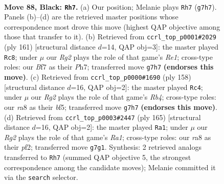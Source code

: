 \documentclass[11pt]{article}
\begin{document}
\clearpage

\begin{figure}[p]\centering
\begin{subfigure}{0.46\textwidth}\centering
\resizebox{\linewidth}{!}{%
\newchessgame
\chessboard[
  setfen={R7/2k2br1/8/1P2R3/4K3/8/8/8 b - - 4 88},
  showmover=false,
  pgfstyle=straightmove, color=movearrow, markmove={g7-h7}
]}
\caption{}
\end{subfigure}\hfill
\begin{subfigure}{0.46\textwidth}\centering
\resizebox{\linewidth}{!}{%
\newchessgame
\chessboard[
  setfen={4r3/7p/5k2/8/6RP/6K1/8/8 b - - 0 81},
  showmover=false,
  pgfstyle=straightmove, color=movearrow, markmove={e8-c8}
]}
\caption{}
\end{subfigure}
\\[4pt]
\begin{subfigure}{0.46\textwidth}\centering
\resizebox{\linewidth}{!}{%
\newchessgame
\chessboard[
  setfen={8/8/3r1k2/4pb2/BR6/4K3/8/8 w - - 8 80},
  showmover=false,
  pgfstyle=straightmove, color=movearrow, markmove={b4-c4}
]}
\caption{}
\end{subfigure}\hfill
\begin{subfigure}{0.46\textwidth}\centering
\resizebox{\linewidth}{!}{%
\newchessgame
\chessboard[
  setfen={r7/8/8/8/4bk2/7R/5P1K/8 b - - 33 83},
  showmover=false,
  pgfstyle=straightmove, color=movearrow, markmove={a8-a1}
]}
\caption{}
\end{subfigure}
\caption{\textbf{Move 88, Black: \texttt{Rh7}.} (a) Our position; Melanie plays \texttt{Rh7} (\texttt{g7h7}). Panels (b)--(d) are the retrieved master positions whose correspondence most drove this move (highest QAP objective among those that transfer to it). (b) Retrieved from \texttt{ccrl\_top\_p0001\#2029} (ply 161) [structural distance $d$=14, QAP obj=3]: the master played \texttt{Rc8}; under $\mu$ our \emph{Rg2} plays the role of that game's \emph{Re1}; cross-type roles: our \emph{B}f7 as their \emph{P}h7; transferred move \texttt{g7h7} \textbf{(endorses this move)}. (c) Retrieved from \texttt{ccrl\_top\_p0000\#1690} (ply 158) [structural distance $d$=16, QAP obj=2]: the master played \texttt{Rc4}; under $\mu$ our \emph{Rg2} plays the role of that game's \emph{Rb4}; cross-type roles: our \emph{r}a8 as their \emph{b}f5; transferred move \texttt{g7h7} \textbf{(endorses this move)}. (d) Retrieved from \texttt{ccrl\_top\_p0003\#2447} (ply 165) [structural distance $d$=16, QAP obj=2]: the master played \texttt{Ra1}; under $\mu$ our \emph{Rg2} plays the role of that game's \emph{Ra1}; cross-type roles: our \emph{r}a8 as their \emph{p}f2; transferred move \texttt{g7g1}. Synthesis: 2 retrieved analogs transferred to \texttt{Rh7} (summed QAP objective 5, the strongest correspondence among the candidate moves); Melanie committed it via the \texttt{search} selector.}
\label{fig:thought-m175}
\end{figure}
\end{document}
